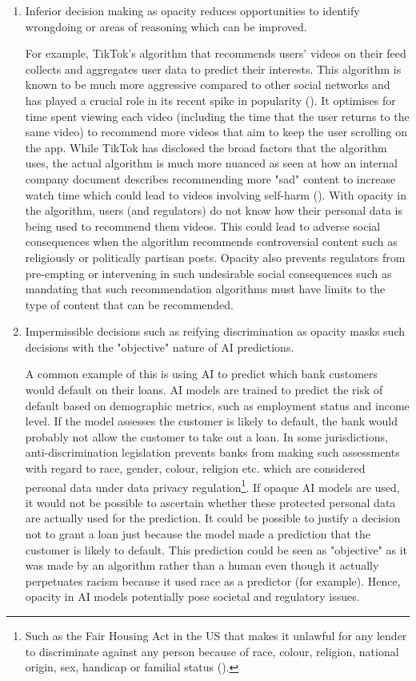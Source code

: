 \begin{enumerate}
  \item Inferior decision making as opacity reduces opportunities to identify wrongdoing or areas of reasoning which can be improved. 
  
  For example, TikTok's algorithm that recommends users' videos on their feed collects and aggregates user data to predict their interests. This algorithm is known to be much more aggressive compared to other social networks and has played a crucial role in its recent spike in popularity (\cite{tiktok_guardian}). It optimises for time spent viewing each video (including the time that the user returns to the same video) to recommend more videos that aim to keep the user scrolling on the app. While TikTok has disclosed the broad factors that the algorithm uses, the actual algorithm is much more nuanced as seen at how an internal company document describes recommending more "sad" content to increase watch time which could lead to videos involving self-harm (\cite{tiktok_nytimes}). With opacity in the algorithm, users (and regulators) do not know how their personal data is being used to recommend them videos. This could lead to adverse social consequences when the algorithm recommends controversial content such as religiously or politically partisan posts. Opacity also prevents regulators from pre-empting or intervening in such undesirable social consequences such as mandating that such recommendation algorithms must have limits to the type of content that can be recommended.
  
  \item Impermissible decisions such as reifying discrimination as opacity masks such decisions with the "objective" nature of AI predictions.
  
  A common example of this is using AI to predict which bank customers would default on their loans. AI models are trained to predict the risk of default based on demographic metrics, such as employment status and income level. If the model assesses the customer is likely to default, the bank would probably not allow the customer to take out a loan. In some jurisdictions, anti-discrimination legislation prevents banks from making such assessments with regard to race, gender, colour, religion etc. which are considered personal data under data privacy regulation\footnote{Such as the Fair Housing Act in the US that makes it unlawful for any lender to discriminate against any person because of race, colour, religion, national origin, sex, handicap or familial status (\cite{fairhousingact}).}. If opaque AI models are used, it would not be possible to ascertain whether these protected personal data are actually used for the prediction. It could be possible to justify a decision not to grant a loan just because the model made a prediction that the customer is likely to default. This prediction could be seen as "objective" as it was made by an algorithm rather than a human even though it actually perpetuates racism because it used race as a predictor (for example). Hence, opacity in AI models potentially pose societal and regulatory issues.


\end{enumerate}

